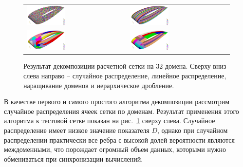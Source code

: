 \begin{figure}[ht]
\centering
\begin{tabular}{ll}
\includegraphics[width=0.4\textwidth]{fig/par_wing_random_32.png}
&
\includegraphics[width=0.4\textwidth]{fig/par_wing_linear_32.png}
\\
\includegraphics[width=0.4\textwidth]{fig/par_wing_rgrow_32.png}
&
\includegraphics[width=0.4\textwidth]{fig/par_wing_hierarchical_32.png}
\end{tabular}
\singlespacing
{}\caption{Результат декомпозиции расчетной сетки на 32 домена. Сверху вниз слева направо -- случайное распределение, линейное распределение, наращивание доменов и иерархическое дробление.}
\label{fig:text_2_decompsurf_4}
\end{figure}

В качестве первого и самого простого алгоритма декомпозиции рассмотрим случайное распределения ячеек сетки по доменам.
Результат применения этого алгоритма к тестовой сетке показан на рис.~\ref{fig:text_2_decompsurf_4} сверху слева.
Случайное распределение имеет низкое значение показателя $D$, однако при случайном распределении практически все ребра с высокой долей вероятности являются междоменными, что порождает огромный объем данных, которыми нужно обмениваться при синхронизации вычислений.

